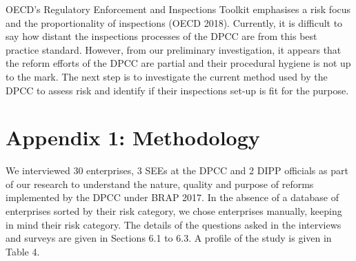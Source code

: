\documentclass[a4paper, 12pt]{article}
\begin{document}
	OECD’s Regulatory Enforcement and Inspections Toolkit emphasises a risk focus and the proportionality of inspections (OECD 2018). Currently, it is difficult to say how distant the inspections processes of the DPCC are from this best practice standard. However, from our preliminary investigation, it appears that the reform efforts of the DPCC are partial and their procedural hygiene is not up to the mark. The next step is to investigate the current method used by the DPCC to assess risk and identify if their inspections set-up is fit for the purpose. \\
	
	\newpage
		\section{Appendix 1: Methodology}
		
		We interviewed 30 enterprises, 3 SEEs at the DPCC and 2 DIPP officials as part of our research to understand the nature, quality and purpose of reforms implemented by the DPCC under BRAP 2017. In the absence of a database of enterprises sorted by their risk category, we chose enterprises manually, keeping in mind their risk category. The details of the questions asked in the interviews and surveys are given in Sections 6.1 to 6.3. A profile of the study is given in Table 4. \\
		
		
\end{document}
